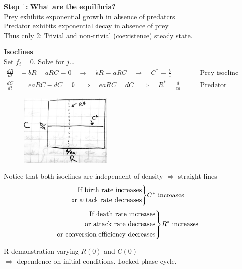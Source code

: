 \documentclass{article}
\newcommand{\note}[1]{\colorbox{gray!30}{#1}}
\newcommand{\ind}{\-\hspace{1cm}}
\newenvironment{rcases}
  {\left.\begin{aligned}}
  {\end{aligned}\right\rbrace}
\begin{document}
\textbf{Step 1:} \textbf{What are the equilibria?}\\
\ind Prey exhibits exponential growth in absence of predators\\
\ind Predator exhibits exponential decay in absence of prey\\
\ind \ind Thus only 2:  Trivial and non-trivial (coexistence) steady state.

\textbf{Isoclines}\\
Set $f_i=0$.  Solve for $j$...
\begin{align*}
	\frac{dR}{dt} & =bR-aRC=0 \quad \Rightarrow \quad bR=aRC \quad \Rightarrow \quad C^*=\frac{b}{a} \quad \quad &\text{Prey isocline}\\
	\frac{dC}{dt} & = eaRC-dC=0 \quad \Rightarrow \quad eaRC=dC \quad \Rightarrow \quad R^*=\frac{d}{ea} \quad \quad &\text{Predator isocline}
\end{align*}

{
\begin{figure}
\includegraphics[width=4.5cm]{figs/LViso.pdf}
\end{figure}

Notice that both isoclines are independent of density $\Rightarrow$ straight lines!
\begin{equation*}
\begin{rcases}
  \text{If birth rate increases} & \\
  \text{or attack rate decreases} & \\
\end{rcases}
C^* \text{ increases}
\end{equation*}
\begin{equation*}
\begin{rcases}
  \text{If death rate increases} & \\
  \text{or attack rate decreases} & \\
    \text{or conversion efficiency decreases} & \\
\end{rcases}
R^* \text{ increases}
\end{equation*}

}
\ind \note{R-demonstration varying $R(0)$ and $C(0)$} \\
\ind \ind $\Rightarrow$ dependence on initial conditions. Locked phase cycle. 
\end{document}
